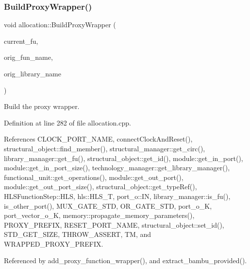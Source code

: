 \subsubsection{\texorpdfstring{Build\+Proxy\+Wrapper()}{BuildProxyWrapper()}}
{\footnotesize\ttfamily void allocation\+::\+Build\+Proxy\+Wrapper (\begin{DoxyParamCaption}\item[{\hyperlink{structfunctional__unit}{functional\+\_\+unit} $\ast$}]{current\+\_\+fu,  }\item[{const std\+::string \&}]{orig\+\_\+fun\+\_\+name,  }\item[{const std\+::string \&}]{orig\+\_\+library\+\_\+name }\end{DoxyParamCaption})\hspace{0.3cm}{\ttfamily [protected]}}



Build the proxy wrapper. 



Definition at line 282 of file allocation.\+cpp.



References C\+L\+O\+C\+K\+\_\+\+P\+O\+R\+T\+\_\+\+N\+A\+ME, connect\+Clock\+And\+Reset(), structural\+\_\+object\+::find\+\_\+member(), structural\+\_\+manager\+::get\+\_\+circ(), library\+\_\+manager\+::get\+\_\+fu(), structural\+\_\+object\+::get\+\_\+id(), module\+::get\+\_\+in\+\_\+port(), module\+::get\+\_\+in\+\_\+port\+\_\+size(), technology\+\_\+manager\+::get\+\_\+library\+\_\+manager(), functional\+\_\+unit\+::get\+\_\+operations(), module\+::get\+\_\+out\+\_\+port(), module\+::get\+\_\+out\+\_\+port\+\_\+size(), structural\+\_\+object\+::get\+\_\+type\+Ref(), H\+L\+S\+Function\+Step\+::\+H\+LS, hls\+::\+H\+L\+S\+\_\+T, port\+\_\+o\+::\+IN, library\+\_\+manager\+::is\+\_\+fu(), is\+\_\+other\+\_\+port(), M\+U\+X\+\_\+\+G\+A\+T\+E\+\_\+\+S\+TD, O\+R\+\_\+\+G\+A\+T\+E\+\_\+\+S\+TD, port\+\_\+o\+\_\+K, port\+\_\+vector\+\_\+o\+\_\+K, memory\+::propagate\+\_\+memory\+\_\+parameters(), P\+R\+O\+X\+Y\+\_\+\+P\+R\+E\+F\+IX, R\+E\+S\+E\+T\+\_\+\+P\+O\+R\+T\+\_\+\+N\+A\+ME, structural\+\_\+object\+::set\+\_\+id(), S\+T\+D\+\_\+\+G\+E\+T\+\_\+\+S\+I\+ZE, T\+H\+R\+O\+W\+\_\+\+A\+S\+S\+E\+RT, TM, and W\+R\+A\+P\+P\+E\+D\+\_\+\+P\+R\+O\+X\+Y\+\_\+\+P\+R\+E\+F\+IX.



Referenced by add\+\_\+proxy\+\_\+function\+\_\+wrapper(), and extract\+\_\+bambu\+\_\+provided().

